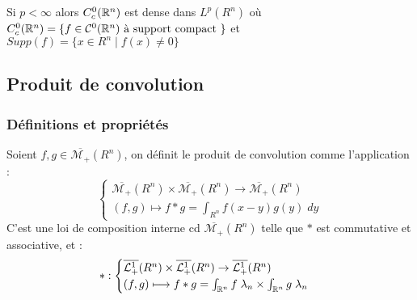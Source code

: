\begin{theorem}
    Si $p < \infty$ alors $C^0_c(\mathbb{R}^n)$ est dense dans $L^p(R^n)$ 
    où $C^0_c(\mathbb{R}^n) = \{f \in \mathcal{C}^0(\mathbb{R}^n) \text{ à support compact }\} $ 
    et $ Supp(f) = \{x \in R^n \; | \; f(x) \not = 0\}$ 
\end{theorem}


\subsection{Produit de convolution}

\subsubsection{Définitions et propriétés}

\begin{definition}
    Soient $f,g \in \overline{\mathcal{M}_+}(R^n)$, on définit le produit de convolution comme l'application :
        \[ \boxed{
            \begin{cases}
                \overline{\mathcal{M}_+}(R^n) \times \overline{\mathcal{M}_+}(R^n) \rightarrow \overline{\mathcal{M}_+}(R^n) \\ 
                (f,g) \longmapsto f \ast g = \int_{R^n} f(x-y)g(y) \; dy
            \end{cases}}
        \]
    C'est une loi de composition interne cd $\overline{\mathcal{M}_+}(R^n)$ telle que $\ast$ est commutative et associative, et :
        \[ \ast : 
            \begin{cases}
                \overline{\mathcal{L}_+^1}(R^n) \times \overline{\mathcal{L}_+^1}(R^n) \rightarrow \overline{\mathcal{L}_+^1}(R^n) \\ 
                (f,g) \longmapsto f \ast g = \int_{\mathbb{R}^n} f\; \lambda_n \times \int_{\mathbb{R}^n} g\; \lambda_n 
            \end{cases}
        \] 
\end{definition}

